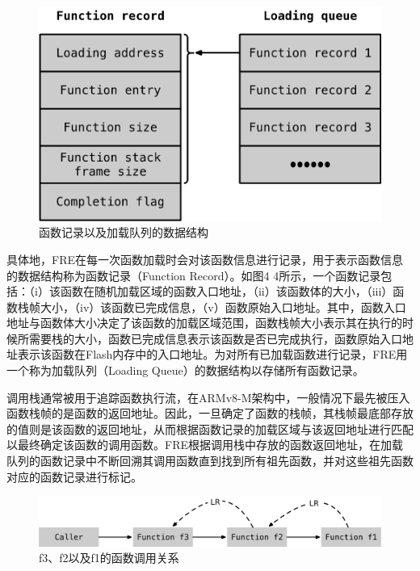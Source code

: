 \documentclass[12pt,a4paper]{ctexart}
\numberwithin{figure}{section}
\begin{document}
\begin{figure}[h]
    \centering
    \includegraphics[scale=0.7]{graph/dataStructure.png}
    \caption{函数记录以及加载队列的数据结构}
\end{figure}
\par 具体地，FRE在每一次函数加载时会对该函数信息进行记录，用于表示函数信息的数据结构称为函数记录（Function Record）。如图4 4所示，一个函数记录包括：（i）该函数在随机加载区域的函数入口地址，（ii）该函数体的大小，（iii）函数栈帧大小，（iv）该函数已完成信息，（v）函数原始入口地址。其中，函数入口地址与函数体大小决定了该函数的加载区域范围，函数栈帧大小表示其在执行的时候所需要栈的大小，函数已完成信息表示该函数是否已完成执行，函数原始入口地址表示该函数在Flash内存中的入口地址。为对所有已加载函数进行记录，FRE用一个称为加载队列（Loading Queue）的数据结构以存储所有函数记录。
\par 调用栈通常被用于追踪函数执行流，在ARMv8-M架构中，一般情况下最先被压入函数栈帧的是函数的返回地址。因此，一旦确定了函数的栈帧，其栈帧最底部存放的值则是该函数的返回地址，从而根据函数记录的加载区域与该返回地址进行匹配以最终确定该函数的调用函数。FRE根据调用栈中存放的函数返回地址，在加载队列的函数记录中不断回溯其调用函数直到找到所有祖先函数，并对这些祖先函数对应的函数记录进行标记。
\begin{figure}[h]
    \centering
    \includegraphics[scale=0.5]{graph/funcCall.png}
    \caption{f3、f2以及f1的函数调用关系}
\end{figure}
\end{document}
